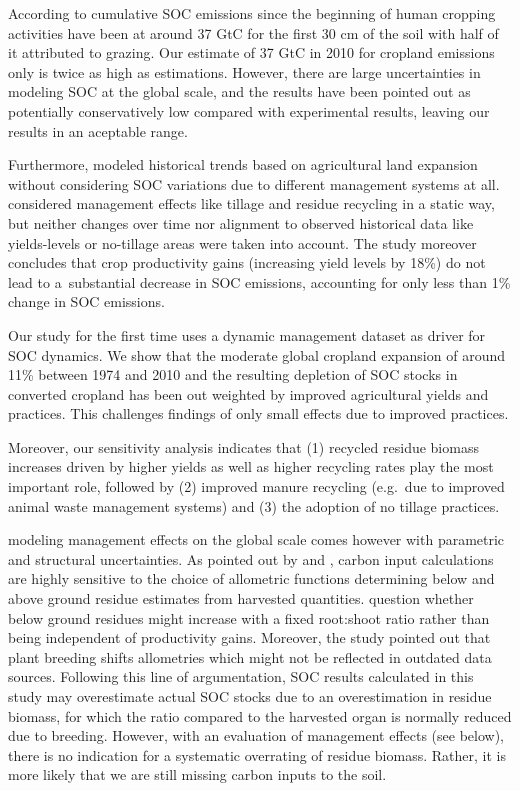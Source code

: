 \documentclass[gc, manuscript]{copernicus}
\begin{document}
According to \citep{sanderman_soil_2017} cumulative SOC emissions since the beginning of human cropping activities have been at around 37 GtC for the first 30 cm of the soil with half of it attributed to grazing. Our estimate of 37 GtC in 2010 for cropland emissions only is twice as high as \citep{sanderman_soil_2017} estimations. However, there are large uncertainties in modeling SOC at the global scale, and the \citep{sanderman_soil_2017} results have been pointed out as potentially conservatively low compared with experimental results, leaving our results in an aceptable range.

Furthermore, \citep{sanderman_soil_2017} modeled historical trends based on agricultural land expansion without considering SOC variations due to different management systems at all. \citep{pugh_simulated_2015} considered management effects like tillage and residue recycling in a static way, but neither changes over time nor alignment to observed historical data like yields-levels or no-tillage areas were taken into account. The study moreover concludes that crop productivity gains (increasing yield levels by 18\%) do not lead to a~substantial decrease in SOC emissions, accounting for only less than 1\% change in SOC emissions.

Our study for the first time uses a dynamic management dataset as driver for SOC dynamics. We show that the moderate global cropland expansion of around 11\% between 1974 and 2010 and the resulting depletion of SOC stocks in converted cropland has been out weighted by improved agricultural yields and practices. This challenges \citep{pugh_simulated_2015} findings of only small effects due to improved practices.

Moreover, our sensitivity analysis indicates that (1) recycled residue biomass increases driven by higher yields as well as higher recycling rates play the most important role, followed by (2) improved manure recycling (e.g.~due to improved animal waste management systems) and (3) the adoption of no tillage practices.

modeling management effects on the global scale comes however with parametric and structural uncertainties. As pointed out by \citep{keel_large_2017} and \citep{smith_how_2020}, carbon input calculations are highly sensitive to the choice of allometric functions determining below and above ground residue estimates from harvested quantities. \citep{keel_large_2017} question whether below ground residues might increase with a fixed root:shoot ratio rather than being independent of productivity gains. Moreover, the study pointed out that plant breeding shifts allometries which might not be reflected in outdated data sources. Following this line of argumentation, SOC results calculated in this study may overestimate actual SOC stocks due to an overestimation in residue biomass, for which the ratio compared to the harvested organ is normally reduced due to breeding. However, with an evaluation of management effects (see below), there is no indication for a systematic overrating of residue biomass. Rather, it is more likely that we are still missing carbon inputs to the soil.
\end{document}
